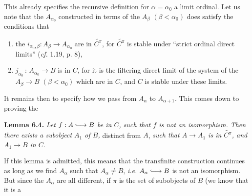 \documentclass[11pt]{article}
\newcommand{\msp}[1]{\marginpar{\footnotesize [#1]}}
\newcommand{\into}{\lhook\joinrel\longrightarrow}
\begin{document}
\msp{page 79}
This already specifies the recursive definition for $\alpha = \alpha_{0}$ a limit ordinal. Let us note that the $A_{\alpha_{0}}$ constructed in terms of the $A_{\beta}$ $(\beta < \alpha_{0})$ does satisfy the conditions that
\begin{enumerate}[label={}]
\item[\textit{a})] the $i_{\alpha_{0},\beta} : A_{\beta} \longrightarrow A_{\alpha_{0}}$ are in $\widetilde{C^{\pi}}$, for $\widetilde{C^{\pi}}$ is stable under ``strict ordinal direct limits'' (\textit{cf.} 1.19, p. 8),
\item[\textit{b})] $j_{\alpha_{0}} \, : \, A_{\alpha_{0}} \longrightarrow B$ is in $C$, for it is the filtering direct limit of the system of the $A_{\beta} \longrightarrow B$ $(\beta < \alpha_{0})$ which are in $C$, and $C$ is stable under these limits.
\end{enumerate}
It remains then to specify how we pass from $A_{\alpha}$ to $A_{\alpha+1}$. This comes down to proving the

\textbf{Lemma 6.4.} \textit{Let $f : A \into B$ be in $C$, such that $f$ is not an isomorphism. Then there exists a subobject $A_{1}$ of $B$,} distinct from $A$, \textit{such that $A \longrightarrow A_{1}$ is in $\widetilde{C^{\pi}}$, and $A_{1} \longrightarrow B$ in $C$.}

If this lemma is admitted, this means that the transfinite construction continues as long as we find $A_{\alpha}$ such that $A_{\alpha} \neq B$, \textit{i.e.} $A_{\alpha} \into B$ is not an isomorphism. But since the $A_{\alpha}$ are all different, if $\pi$ is the set of subobjects of $B$ (we know that it is a
\end{document}
